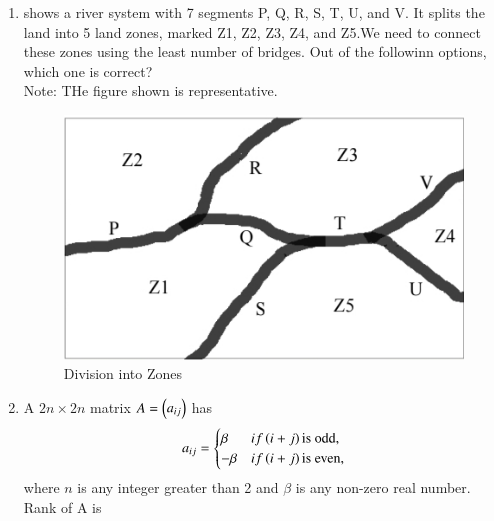 \documentclass[journal,12pt,onecolumn]{IEEEtran}
\theoremstyle{remark}
\begin{document}
\begin{enumerate}
\item {} shows a river system with 7 segments P, Q, R, S, T, U, and V. It splits the land into 5 land zones, marked Z1, Z2, Z3, Z4, and Z5.We need to connect these zones using the least number of bridges. Out of the followinn options, which one is correct?\\
Note: THe figure shown is representative. \par\hfill{}
\begin{figure}[H]
\centering
\includegraphics[width=0.4\columnwidth]{Figs/Q-10.jpg}
\caption{Division into Zones}
\label{10}
\end{figure}
\begin{enumerate}
\end{enumerate}

\item A $2n \times 2n$ matrix $A=\begin{pmatrix}a_{ij}\end{pmatrix}$ has \\

$$
a_{ij} = 
\begin{cases}
    \beta & if \left(i+j\right) \text{is odd},\\
    -\beta & if \left(i+j\right) \text{is even},
\end{cases}$$
where $n$ is any integer greater than 2 and $\beta$ is any non-zero real number. Rank of A is
\par\hfill{}
\begin{enumerate}
\end{enumerate}


\end{enumerate}
\end{document}
